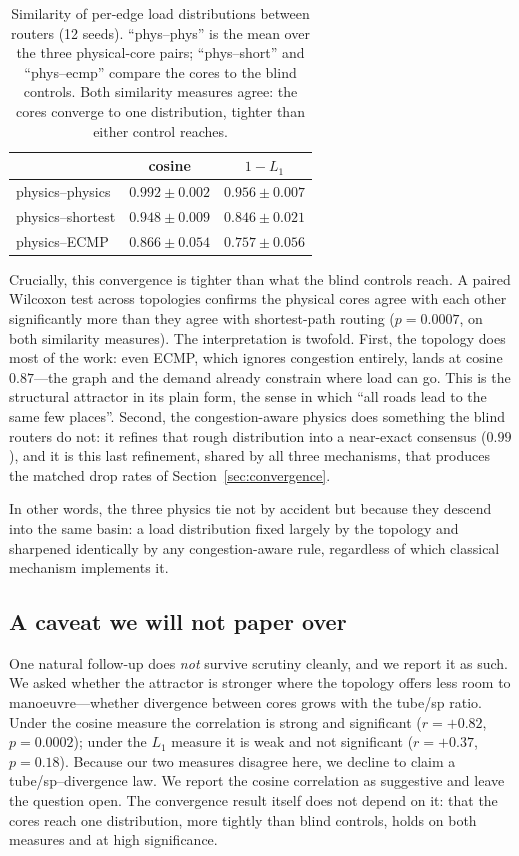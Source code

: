 \begin{table}[t]
\centering
\caption{Similarity of per-edge load distributions between routers (12 seeds).
``phys--phys'' is the mean over the three physical-core pairs; ``phys--short''
and ``phys--ecmp'' compare the cores to the blind controls. Both similarity
measures agree: the cores converge to one distribution, tighter than either
control reaches.}
\label{tab:attractor}
\small
\begin{tabular}{lcc}
\toprule
 & cosine & $1-L_1$ \\
\midrule
physics--physics  & $0.992 \pm 0.002$ & $0.956 \pm 0.007$ \\
physics--shortest & $0.948 \pm 0.009$ & $0.846 \pm 0.021$ \\
physics--ECMP     & $0.866 \pm 0.054$ & $0.757 \pm 0.056$ \\
\bottomrule
\end{tabular}
\end{table}

Crucially, this convergence is tighter than what the blind controls reach. A
paired Wilcoxon test across topologies confirms the physical cores agree with
each other significantly more than they agree with shortest-path routing
($p = 0.0007$, on both similarity measures). The interpretation is twofold.
First, the topology does most of the work: even ECMP, which ignores congestion
entirely, lands at cosine $0.87$---the graph and the demand already constrain
where load can go. This is the structural attractor in its plain form, the
sense in which ``all roads lead to the same few places''. Second, the
congestion-aware physics does something the blind routers do not: it refines
that rough distribution into a near-exact consensus ($0.99$), and it is this
last refinement, shared by all three mechanisms, that produces the matched
drop rates of Section~\ref{sec:convergence}.

In other words, the three physics tie not by accident but because they descend
into the same basin: a load distribution fixed largely by the topology and
sharpened identically by any congestion-aware rule, regardless of which
classical mechanism implements it.

\subsection{A caveat we will not paper over}

One natural follow-up does \emph{not} survive scrutiny cleanly, and we report it
as such. We asked whether the attractor is stronger where the topology offers
less room to manoeuvre---whether divergence between cores grows with the tube/sp
ratio. Under the cosine measure the correlation is strong and significant
($r = +0.82$, $p = 0.0002$); under the $L_1$ measure it is weak and not
significant ($r = +0.37$, $p = 0.18$). Because our two measures disagree here,
we decline to claim a tube/sp--divergence law. We report the cosine correlation
as suggestive and leave the question open. The convergence result itself does
not depend on it: that the cores reach one distribution, more tightly than blind
controls, holds on both measures and at high significance.
